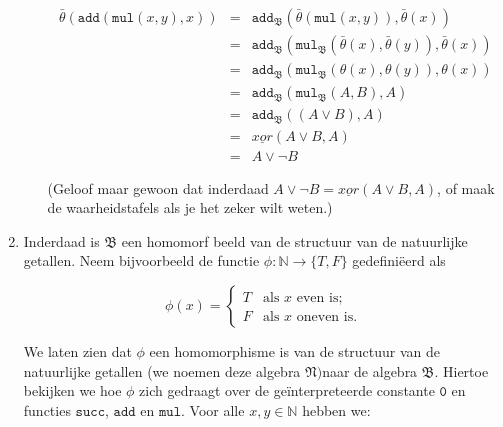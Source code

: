 \documentclass[a4paper,11pt]{article}
\begin{document}
\begin{enumerate}
\begin{itemize}
\begin{eqnarray*}
\bar \theta(\texttt{add}(\texttt{mul}(x,y),x)) & = & \texttt{add}_{\mathfrak{B}}(\bar \theta(\texttt{mul}(x, y)), \bar \theta(x)) \\
                                               & = & \texttt{add}_{\mathfrak{B}}(\texttt{mul}_{\mathfrak{B}}(\bar \theta(x), \bar \theta(y)), \bar \theta(x)) \\
                                               & = & \texttt{add}_{\mathfrak{B}}(\texttt{mul}_{\mathfrak{B}}(\theta(x), \theta(y)), \theta(x)) \\
                                               & = & \texttt{add}_{\mathfrak{B}}(\texttt{mul}_{\mathfrak{B}}(A, B), A) \\
                                               & = & \texttt{add}_{\mathfrak{B}}((A \vee B), A) \\
                                               & = & \underline{xor}(A \vee B, A) \\
                                               & = & A \vee \neg B
\end{eqnarray*}

(Geloof maar gewoon dat inderdaad $A \vee \neg B = \underline{xor}(A \vee B,
A)$, of maak de waarheidstafels als je het zeker wilt weten.)

\end{itemize}

\item %
Inderdaad is $\mathfrak{B}$ een homomorf beeld van de structuur van de
natuurlijke getallen. Neem bijvoorbeeld de functie $\phi : \mathbb{N}
\rightarrow \{T,F\}$ gedefini\"eerd als

\begin{displaymath}
\phi(x) = \begin{cases}
  T & \text{als $x$ even is;} \\
  F & \text{als $x$ oneven is.}
\end{cases}
\end{displaymath}

We laten zien dat $\phi$ een homomorphisme is van de structuur van de
natuurlijke getallen (we noemen deze algebra $\mathfrak{N}) $naar de algebra
$\mathfrak{B}$. Hiertoe bekijken we hoe $\phi$ zich gedraagt over de
ge\"interpreteerde constante $\texttt{0}$ en functies $\texttt{succ}$,
$\texttt{add}$ en $\texttt{mul}$. Voor alle $x,y \in \mathbb{N}$ hebben we:

\begin{itemize}


\end{itemize}
\end{enumerate}
\end{document}
